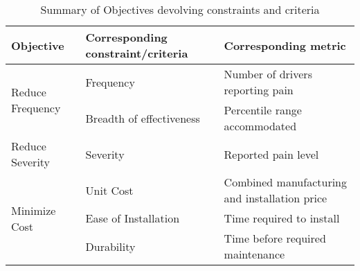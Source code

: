 \documentclass[11pt]{article}
\begin{document}
\begin{table}[h!]
\centering
\caption{Summary of Objectives devolving constraints and criteria}
\begin{tabular}{l l p{5cm}}
Objective & Corresponding constraint/criteria & Corresponding metric \\ \hline
\multirow{2}{*}{Reduce Frequency} & Frequency & Number of drivers reporting pain \\
& Breadth of effectiveness & Percentile range accommodated \\
Reduce Severity & Severity & Reported pain level \\
\multirow{3}{*}{Minimize Cost} & Unit Cost & Combined manufacturing and installation price \\
& Ease of Installation & Time required to install \\
& Durability & Time before required maintenance \\
\end{tabular}
\end{table}


\end{document}
